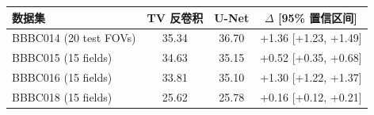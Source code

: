 \begin{tabular}{lccc}
\toprule
数据集 & TV 反卷积 & U-Net & $\Delta$ [95\% 置信区间] \\
\midrule
BBBC014 (20 test FOVs) & 35.34 & 36.70 & +1.36 [+1.23, +1.49] \\
BBBC015 (15 fields) & 34.63 & 35.15 & +0.52 [+0.35, +0.68] \\
BBBC016 (15 fields) & 33.81 & 35.10 & +1.30 [+1.22, +1.37] \\
BBBC018 (15 fields) & 25.62 & 25.78 & +0.16 [+0.12, +0.21] \\
\bottomrule
\end{tabular}
